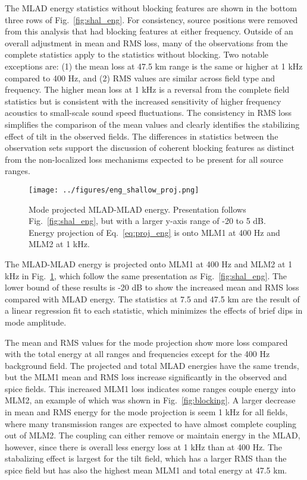 \documentclass[preprint,NumberedRefs]{JASA}
\begin{document}
The MLAD energy statistics without blocking features are shown in the bottom three rows of Fig.~\ref{fig:shal_eng}. For consistency, source positions were removed from this analysis that had blocking features at either frequency. Outside of an overall adjustment in mean and RMS loss, many of the observations from the complete statistics apply to the statistics without blocking. Two notable exceptions are: (1) the mean loss at 47.5 km range is the same or higher at 1 kHz compared to 400 Hz, and (2) RMS values are similar across field type and frequency. The higher mean loss at 1 kHz is a reversal from the complete field statistics but is consistent with the increased sensitivity of higher frequency acoustics to small-scale sound speed fluctuations. The consistency in RMS loss simplifies the comparison of the mean values and clearly identifies the stabilizing effect of tilt in the observed fields. The differences in statistics between the observation sets support the discussion of coherent blocking features as distinct from the non-localized loss mechanisms expected to be present for all source ranges.

\begin{figure}
\texttt{[image: ../figures/eng\_shallow\_proj.png]}
    \caption{Mode projected MLAD-MLAD energy. Presentation follows Fig.~\ref{fig:shal_eng}, but with a larger y-axis range of -20 to 5 dB. Energy projection of Eq.~\eqref{eq:proj_eng} is onto MLM1 at 400 Hz and MLM2 at 1 kHz.}
    \label{fig:shal_proj}
\end{figure}
The MLAD-MLAD energy is projected onto MLM1 at 400 Hz and MLM2 at 1 kHz in Fig.~\ref{fig:shal_proj}, which follow the same presentation as Fig.~\ref{fig:shal_eng}. The lower bound of these results is -20 dB to show the increased mean and RMS loss compared with MLAD energy. The statistics at 7.5 and 47.5 km are the result of a linear regression fit to each statistic, which minimizes the effects of brief dips in mode amplitude.

The mean and RMS values for the mode projection show more loss compared with the total energy at all ranges and frequencies except for the 400 Hz background field. The projected and total MLAD energies have the same trends, but the MLM1 mean and RMS loss increase significantly in the observed and spice fields. This increased MLM1 loss indicates some ranges couple energy into MLM2, an example of which was shown in Fig.~\ref{fig:blocking}. A larger decrease in mean and RMS energy for the mode projection is seem 1 kHz for all fields, where many transmission ranges are expected to have almost complete coupling out of MLM2. The coupling can either remove or maintain energy in the MLAD, however, since there is overall less energy loss at 1 kHz than at 400 Hz. The stabalizing effect is largest for the tilt field, which has a larger RMS than the spice field but has also the highest mean MLM1 and total energy at 47.5 km.
\end{document}
